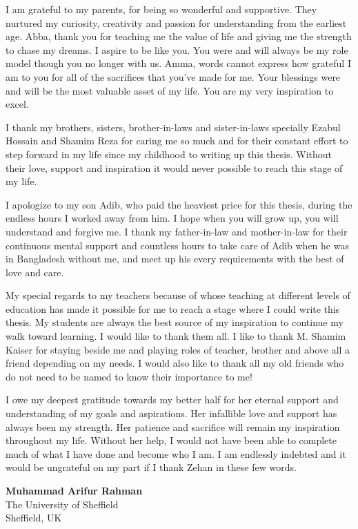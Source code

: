 \begin{acknowledgements}
I am grateful to my parents, for being so wonderful and supportive. They nurtured my curiosity, creativity and passion for understanding from the earliest age. Abba, thank you for teaching me the value of life and giving me the strength to chase my dreams. I aspire to be like you. You were and will always be my role model though you no longer with us. Amma, words cannot express how grateful I am to you for all of the sacrifices that you’ve made for me. Your blessings were and will be the most valuable asset of my life. You are my very inspiration to excel.  

I thank my brothers, sisters, brother-in-laws and sister-in-laws specially Ezabul Hossain and Shamim Reza for caring me so much and for their constant effort to step forward in my life since my childhood to writing up this thesis. Without their love, support and inspiration it would never possible to reach this stage of my life. 

I apologize to my son Adib, who paid the heaviest price for this thesis, during the endless hours I worked away from him. I hope when you will grow up, you will understand and forgive me. I thank my father-in-law and mother-in-law for their continuous mental support and countless hours to take care of Adib when he was in Bangladesh without me, and meet up his every requirements with the best of love and care. 

My special regards to my teachers because of whose teaching at different levels of education has made it possible for me to reach a stage where I could write this thesis. My students are always the best source of my inspiration to continue my walk toward learning. I would like to thank them all. I like to thank M. Shamim Kaiser for staying beside me and playing roles of teacher, brother and above all a friend depending on my needs. I would also like to thank all my old friends who do not need to be named to know their importance to me!

I owe my deepest gratitude towards my better half for her eternal support and understanding of my goals and aspirations. Her infallible love and support has always been my strength. Her patience and sacrifice will remain my inspiration throughout my life. Without her help, I would not have been able to complete much of what I have done and become who I am. I am endlessly indebted and it would be ungrateful on my part if I thank Zehan in these few words. \\


{\raggedleft
\textbf{Muhammad Arifur Rahman}\\
The University of Sheffield\\
Sheffield, UK\\
\date{\today}
}


\end{acknowledgements}
